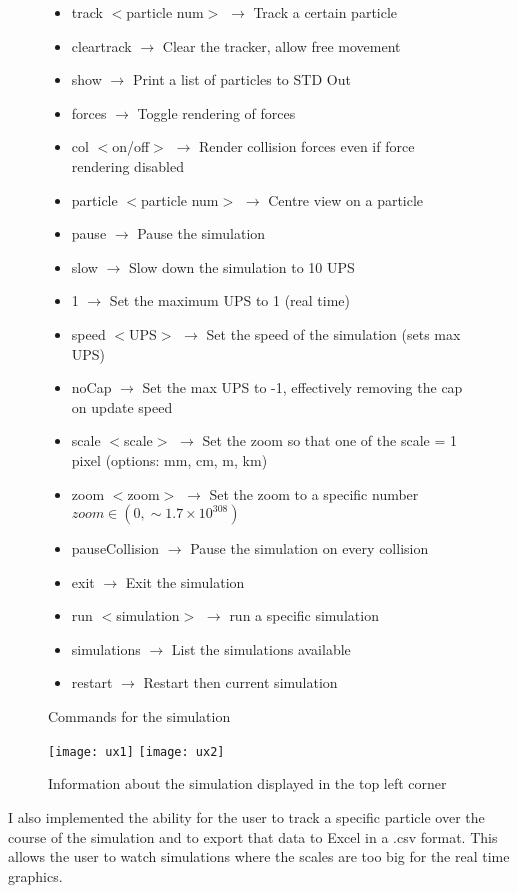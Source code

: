 	\begin{figure}[h]
		\begin{itemize}
			\item track $<$particle num$>$ $\rightarrow$ Track a certain particle
			\item cleartrack $\rightarrow$ Clear the tracker, allow free movement
			\item show $\rightarrow$ Print a list of particles to STD Out
			\item forces $\rightarrow$ Toggle rendering of forces
			\item col $<$on/off$>$ $\rightarrow$ Render collision forces even if force rendering disabled
			\item particle $<$particle num$>$ $\rightarrow$ Centre view on a particle
			\item pause $\rightarrow$ Pause the simulation
			\item slow $\rightarrow$ Slow down the simulation to 10 UPS
			\item 1 $\rightarrow$ Set the maximum UPS to 1 (real time)
			\item speed $<$UPS$>$ $\rightarrow$ Set the speed of the simulation (sets max UPS)
			\item noCap $\rightarrow$ Set the max UPS to -1, effectively removing the cap on update speed
			\item scale $<$scale$>$ $\rightarrow$ Set the zoom so that one of the scale = 1 pixel (options: mm, cm, m, km)			
			\item zoom $<$zoom$>$ $\rightarrow$ Set the zoom to a specific number $zoom \in (0, \sim1.7\times10^{308})$
			\item pauseCollision $\rightarrow$ Pause the simulation on every collision
			\item exit $\rightarrow$ Exit the simulation
			\item run $<$simulation$>$ $\rightarrow$ run a specific simulation
			\item simulations $\rightarrow$ List the simulations available
			\item restart $\rightarrow$ Restart then current simulation
		\end{itemize}
		\caption{Commands for the simulation}
		\label{fig:commands}
	\end{figure}
	
	\begin{figure}
		\centering
		\texttt{[image: ux1]}
		\texttt{[image: ux2]}
		\caption{Information about the simulation displayed in the top left corner}
		\label{fig:uxImg1}
	\end{figure}

	I also implemented the ability for the user to track a specific particle over the course of the simulation and to export that data to Excel in a .csv format. This allows the user to watch simulations where the scales are too big for the real time graphics.
	
	